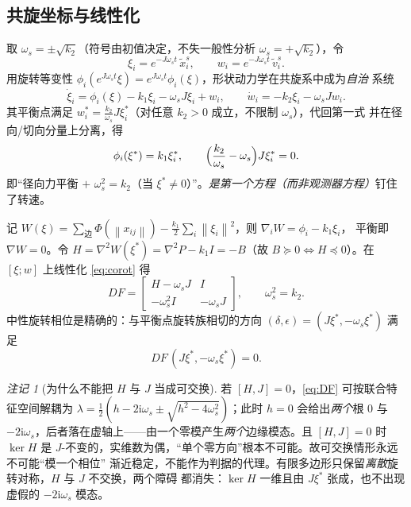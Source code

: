 \documentclass[11pt,a4paper]{ctexart}
\theoremstyle{plain}
\theoremstyle{definition}
\theoremstyle{remark}
\newtheorem{remark}{注记}
\newcommand{\ts}{\tilde{x}^{s}}
\newcommand{\tvs}{\tilde{v}^{s}}
\newcommand{\norm}[1]{\left\|#1\right\|}
\begin{document}
\subsection{共旋坐标与线性化}
取 $\omega_s=\pm\sqrt{k_2}$（符号由初值决定，不失一般性分析 $\omega_s=+\sqrt{k_2}$），令
\begin{equation}
  \xi_i=e^{-J\omega_st}\,\ts_i,\qquad w_i=e^{-J\omega_st}\,\tvs_i .
\end{equation}
用旋转等变性 $\phi_i(e^{J\omega_st}\xi)=e^{J\omega_st}\phi_i(\xi)$，形状动力学在共旋系中成为\emph{自治}
系统
\begin{equation}
  \dot\xi_i=\phi_i(\xi)-k_1\xi_i-\omega_sJ\xi_i+w_i,\qquad
  \dot w_i=-k_2\xi_i-\omega_sJw_i .
  \label{eq:corot}
\end{equation}
其平衡点满足 $w_i^*=\frac{k_2}{\omega_s}J\xi_i^*$（对任意 $k_2>0$ 成立，不限制 $\omega_s$），代回第一式
并在径向/切向分量上分离，得
\begin{equation}
  \phi_i(\xi^*)=k_1\xi_i^*,
  \qquad
  \Bigl(\frac{k_2}{\omega_s}-\omega_s\Bigr)J\xi_i^*=0 .
  \label{eq:eqcorot}
\end{equation}
即“径向力平衡 $+$ $\omega_s^2=k_2$（当 $\xi^*\ne0$）”。\emph{是第一个方程（而非观测器方程）}钉住了转速。

记 $W(\xi)=\sum_{\text{边}}\Phi(\norm{x_{ij}})-\frac{k_1}{2}\sum_i\norm{\xi_i}^2$，则 $\nabla_iW=\phi_i-k_1\xi_i$，
平衡即 $\nabla W=0$。令 $H=\nabla^2W(\xi^*)=\nabla^2P-k_1I=-B$（故 $B\succeq0\iff H\preceq0$）。在
$[\xi;w]$ 上线性化 \eqref{eq:corot} 得
\begin{equation}
  DF=\begin{bmatrix}H-\omega_sJ & I\\ -\omega_s^2I & -\omega_sJ\end{bmatrix},
  \qquad \omega_s^2=k_2 .
  \label{eq:DF}
\end{equation}
中性旋转相位是精确的：与平衡点旋转族相切的方向 $(\delta,\epsilon)=(J\xi^*,-\omega_s\xi^*)$ 满足
\begin{equation}
  DF\,(J\xi^*,-\omega_s\xi^*)=0 .
  \label{eq:neutral}
\end{equation}

\begin{remark}[为什么不能把 $H$ 与 $J$ 当成可交换]
若 $[H,J]=0$，\eqref{eq:DF} 可按联合特征空间解耦为
$\lambda=\frac12(h-2\mathrm i\omega_s\pm\sqrt{h^2-4\omega_s^2})$；此时 $h=0$ 会给出\emph{两个}根
$0$ 与 $-2\mathrm i\omega_s$，后者落在虚轴上——由一个零模产生\emph{两个}边缘模态。且 $[H,J]=0$ 时
$\ker H$ 是 $J$-不变的，实维数为偶，“单个零方向”根本不可能。故可交换情形永远不可能“模一个相位”
渐近稳定，不能作为判据的代理。有限多边形只保留\emph{离散}旋转对称，$H$ 与 $J$ 不交换，两个障碍
都消失：$\ker H$ 一维且由 $J\xi^*$ 张成，也不出现虚假的 $-2\mathrm i\omega_s$ 模态。
\end{remark}
\end{document}
